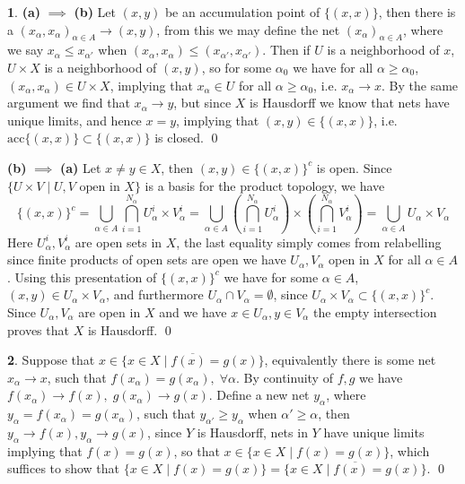 \documentclass[10.5pt]{article}
\theoremstyle{definition}
\newtheorem{pb}{}
\newcommand{\set}[1]{\{#1\}}
\begin{document}
    \begin{pb}
        \textbf{(a)} \(\implies\) \textbf{(b)} Let \((x,y)\) be an accumulation point of \(\set{(x,x)}\), then there is a \((x_\alpha,x_\alpha)_{\alpha\in A} \to (x,y)\), from this we may define the net \((x_\alpha)_{\alpha \in A}\), where we say \(x_\alpha \leq x_{\alpha'}\) when \((x_\alpha,x_\alpha) \leq (x_{\alpha'},x_{\alpha'})\). Then if \(U\) is a neighborhood of \(x\), \(U \times X\) is a neighborhood of \((x,y)\), so for some \(\alpha_0\) we have for all \(\alpha \geq \alpha_0\), \((x_\alpha,x_\alpha) \in U \times X\), implying that \(x_\alpha \in U\) for all \(\alpha \geq \alpha_0\), i.e. \(x_\alpha \to x\).  By the same argument we find that \(x_\alpha \to y\), but since \(X\) is Hausdorff we know that nets have unique limits, and hence \(x = y\), implying that \((x,y) \in \set{(x,x)}\), i.e. \(\text{acc}\set{(x,x)} \subset \set{(x,x)}\) is closed. \qed

        \textbf{(b)} \(\implies\) \textbf{(a)} Let \(x \neq y \in X\), then \((x,y) \in \set{(x,x)}^c\) is open. Since \(\set{U \times V \mid U,V \text{ open in } X}\) is a basis for the product topology, we have 
        \[\set{(x,x)}^c = \bigcup_{\alpha \in A} \bigcap_{i=1}^{N_\alpha} U^i_\alpha \times V^i_\alpha = \bigcup_{\alpha \in A} \left(\bigcap_{i=1}^{N_\alpha}U_\alpha^i\right) \times \left(\bigcap_{i=1}^{N_\alpha}V_\alpha^i\right) = \bigcup_{\alpha \in A} U_\alpha \times V_\alpha\]
         Here \(U_\alpha^i, V_\alpha^i\) are open sets in \(X\), the last equality simply comes from relabelling since finite products of open sets are open we have \(U_\alpha,V_\alpha\) open in \(X\) for all \(\alpha \in A\). Using this presentation of \(\set{(x,x)}^c\) we have for some \(\alpha \in A\), \((x,y) \in U_\alpha \times V_\alpha\), and furthermore \(U_\alpha \cap V_\alpha = \emptyset\), since \(U_\alpha \times V_\alpha \subset \set{(x,x)}^c\). Since \(U_\alpha, V_\alpha\) are open in \(X\) and we have \(x \in U_\alpha, y \in V_\alpha\) the empty intersection proves that \(X\) is Hausdorff. \qed
    \end{pb}
    \begin{pb}
        Suppose that \(x \in \overline{\set{x \in X \mid f(x) = g(x)}}\), equivalently there is some net \(x_\alpha \to x\), such that \(f(x_\alpha) = g(x_\alpha), \; \forall \alpha\). By continuity of \(f,g\) we have \(f(x_\alpha) \to f(x), \; g(x_\alpha) \to g(x)\). Define a new net \(y_\alpha\), where \(y_\alpha = f(x_\alpha) = g(x_\alpha)\), such that \(y_{\alpha'} \geq y_\alpha\) when \(\alpha' \geq \alpha\), then \(y_\alpha \to f(x),y_\alpha \to g(x)\), since \(Y\) is Hausdorff, nets in \(Y\) have unique limits implying that \(f(x) = g(x)\), so that \(x \in \set{x \in X \mid f(x) = g(x)}\), which suffices to show that \(\set{x \in X \mid f(x) = g(x)} = \overline{\set{x \in X \mid f(x) = g(x)}}\). \qed
    \end{pb}
\end{document}
